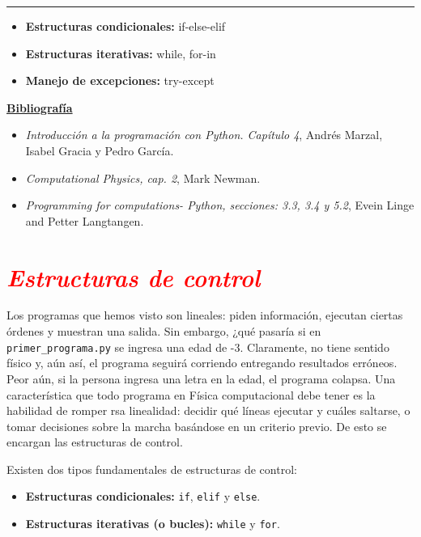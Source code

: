 \documentclass[12pt]{article}
\begin{document}
		\thispagestyle{firstpage}
		\vspace*{1.5cm}
	
	\begin{center}
		\rule{\textwidth}{0.4pt}
	\end{center}
	
	\begin{itemize}[leftmargin=*,label=\textcolor{red}{\ensuremath{\blacktriangleright}}]
		\item \textbf{Estructuras condicionales:} if-else-elif 
		\item \textbf{Estructuras iterativas:} while, for-in
        \item \textbf{Manejo de excepciones:} try-except
	\end{itemize}
	
	\noindent
	\textbf{\underline{Bibliografía}}
	\begin{itemize}[leftmargin=*, label={\textcolor{blue}{$\bullet$}}]
		\item \textit{Introducción a la programación con Python. Capítulo 4}, Andrés Marzal, Isabel Gracia y Pedro García.
		\item \textit{Computational Physics, cap. 2}, Mark Newman.
		\item \textit{Programming for computations- Python,  secciones: 3.3, 3.4 y 5.2}, Evein Linge and 
        Petter Langtangen.
	\end{itemize}
     
    

\section*{\textcolor{red}{\textit{Estructuras de control}}}
	Los programas que hemos visto son lineales: piden información,
    ejecutan ciertas órdenes y muestran una salida. Sin embargo, ¿qué pasaría
    si en \lstinline|primer_programa.py| se ingresa una edad de -3. Claramente, 
    no tiene sentido físico y, aún así, el programa seguirá corriendo entregando
    resultados erróneos. Peor aún, si la persona ingresa una letra en la edad, 
    el programa colapsa.  Una característica que todo programa en 
    Física computacional debe tener es la habilidad de romper rsa linealidad:
    decidir qué líneas ejecutar y cuáles saltarse, o tomar decisiones sobre la marcha
    basándose en un criterio previo. De esto se encargan las estructuras de control.

    Existen dos tipos fundamentales de estructuras de control:
\begin{itemize}
    \item \textbf{Estructuras condicionales:} \lstinline|if|, \lstinline|elif| y \lstinline|else|.
    \item \textbf{Estructuras iterativas (o bucles):} \lstinline|while| y \lstinline|for|.
\end{itemize}
\end{document}
